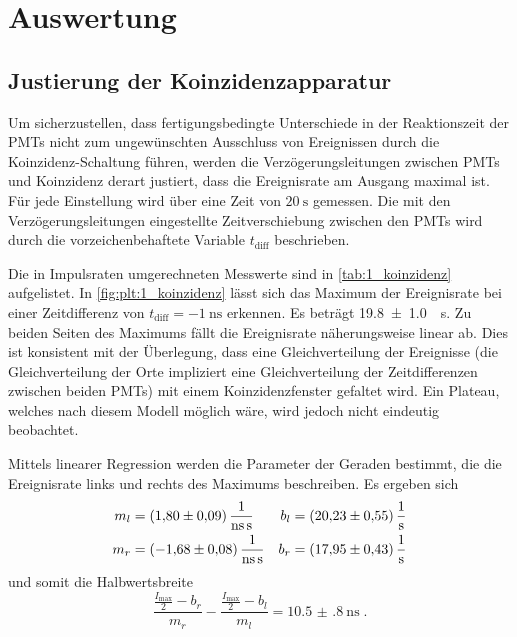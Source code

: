 \section{Auswertung}
\label{sec:auswertung}

\subsection{Justierung der Koinzidenzapparatur} \label{sec:auswertung:koinzidenz}
Um sicherzustellen,
dass fertigungsbedingte Unterschiede in der Reaktionszeit der \acp{PMT}
nicht zum ungewünschten Ausschluss von Ereignissen durch die Koinzidenz-Schaltung führen,
werden die Verzögerungsleitungen zwischen \acp{PMT} und Koinzidenz derart justiert,
dass die Ereignisrate am Ausgang maximal ist.
Für jede Einstellung wird über eine Zeit von $\SI{20}{\second}$ gemessen.
%
Die mit den Verzögerungsleitungen eingestellte Zeitverschiebung zwischen den \acp{PMT}
wird durch die vorzeichenbehaftete Variable $t_\text{diff}$ beschrieben.

Die in Impulsraten umgerechneten Messwerte sind in \autoref{tab:1_koinzidenz} aufgelistet.
In \autoref{fig:plt:1_koinzidenz} lässt sich das Maximum der Ereignisrate
bei einer Zeitdifferenz von $t_\text{diff} = \SI{-1}{\nano\second}$ erkennen.
Es beträgt \SI{19.8 \pm 1.0}{\per\second}.
%
Zu beiden Seiten des Maximums fällt die Ereignisrate näherungsweise linear ab.
Dies ist konsistent mit der Überlegung,
dass eine Gleichverteilung der Ereignisse (die Gleichverteilung der Orte impliziert eine Gleichverteilung der Zeitdifferenzen zwischen beiden \acp{PMT})
mit einem Koinzidenzfenster gefaltet wird.
Ein Plateau,
welches nach diesem Modell möglich wäre,
wird jedoch nicht eindeutig beobachtet.

Mittels linearer Regression werden die Parameter der Geraden bestimmt,
die die Ereignisrate links und rechts des Maximums beschreiben.
Es ergeben sich
\begin{align*}
m_l &= \SI{1.80 \pm 0.09}{\per\nano\second\per\second} &
b_l &= \SI{20.23 \pm 0.55}{\per\second}
\\
m_r &= \SI{-1.68 \pm 0.08}{\per\nano\second\per\second} &
b_r &= \SI{17.95 \pm 0.43}{\per\second}
\end{align*}
und somit die Halbwertsbreite
\[
    \frac{\frac{I_{\max}}{2} - b_r}{m_r}
    -
    \frac{\frac{I_{\max}}{2} - b_l}{m_l}
    = \SI{10.5(8)}{\nano\second} \; .
\]

